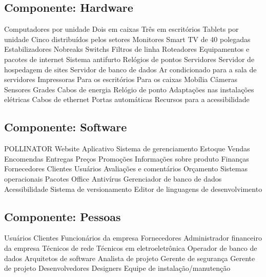      \subsection{Componente: Hardware}
	 \begin{outline}
           \1 Computadores por unidade
	 	\2  Dois em caixas
		\2  Três em escritórios 
	\1 Tablets por unidade
		 \2 Cinco distribuídos pelos setores
	\1 Monitores %
	\1 Smart TV de 40 polegadas
	\1 Estabilizadores	
	\1 Nobreaks 
	\1 Switchs
	\1 Filtros de linha
	\1 Roteadores 
	\1 Equipamentos e pacotes de internet
	\1 Sistema antifurto
	\1 Relógios de pontos
	\1 Servidores
		\2 Servidor de hospedagem de sites
		\2 Servidor de banco de dados
	\1 Ar condicionado para a sala de servidores
	\1 Impressoras
		\2 Para os escritórios
		\2 Para os caixas
	\1 Mobília
	\1 Câmeras
	\1 Sensores
	\1 Grades 
	\1 Cabos de energia 
	\1 Relógio de ponto
	\1 Adaptações nas instalações elétricas 
	\1 Cabos de ethernet 
	\1 Portas automáticas
	\1 Recursos para a acessibilidade 
	 \end{outline}

     \subsection{Componente: Software}
	\begin{outline}
	\1 POLLINATOR %
		\2 Website
		\2 Aplicativo
		\2 Sistema de gerenciamento
			\3 Estoque
			\3 Vendas
			\3 Encomendas
			\3 Entregas
			\3 Preços
			\3 Promoções
			\3 Informações sobre produto
			\3 Finanças
			\3 Fornecedores
			\3 Clientes
			\3 Usuários
			\3 Avaliações e comentários
			\3 Orçamento
	\1 Sistemas operacionais
	\1 Pacotes Office
	\1 Antivírus
	\1 Gerenciador de banco de dados
	\1 Acessibilidade 
	\1 Sistema de versionamento %
	\1 Editor de linguagens de desenvolvimento	
	 \end{outline}
     \subsection{Componente: Pessoas}
	\begin{outline}
	\1 Usuários
	\1 Clientes
	\1 Funcionários da empresa
	\1 Fornecedores 
	\1 Administrador financeiro da empresa
	\1 Técnicos de rede
	\1 Técnicos em eletroeletrônica
	\1 Operador de banco de dados
	\1 Arquitetos de software
	\1 Analista de projeto
	\1 Gerente de segurança
	\1 Gerente de projeto
	\1 Desenvolvedores
	\1 Designers
	\1 Equipe de instalação/manutenção
	\end{outline}
